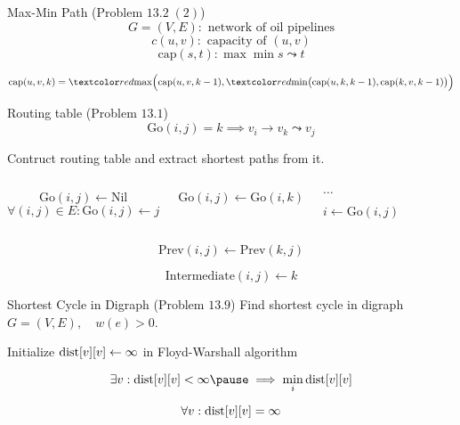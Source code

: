 \begin{frame}{}
  \begin{exampleblock}{Max-Min Path (Problem $13.2\; (2)$)}
    \[
      G = (V, E): \text{ network of oil pipelines}
    \]
    \[
      c(u,v): \text{ capacity of } (u,v)
    \]
    \[
      \text{cap}(s,t): \max \min s \leadsto t
    \]
      
    \vspace{0.30cm}
    \centerline{}
  \end{exampleblock}

  \pause
  \[
    \text{cap}(u,v,k) = \red{\max}\Big(\text{cap}(u,v,k-1), \red{\min}\big(\text{cap}(u,k,k-1), \text{cap}(k,v,k-1)\big)\Big)
  \]
\end{frame}
\begin{frame}{}
  \begin{exampleblock}{Routing table (Problem $13.1$)}
    \[
      \text{Go}(i,j) = k \implies v_i \to v_k \leadsto v_j
    \]

    Contruct routing table and extract shortest paths from it.
  \end{exampleblock}

  \pause
  \vspace{0.30cm}
  \begin{columns}
      \[
	\text{Go}(i,j) \gets \text{Nil}
      \]
      \[
	\forall (i,j) \in E: \text{Go}(i,j) \gets j
      \]

      \begin{algorithmic}
	\If{$\dots$}
	  \State $\text{Go}(i,j) \gets \text{Go}(i,k)$
	\EndIf
      \end{algorithmic}
      \begin{algorithmic}
	  \State $\dots$
	\EndIf

	\Statex
	  \State $i \gets \text{Go}(i,j)$
	\EndWhile
      \end{algorithmic}
  \end{columns}

  \pause
  \vspace{0.50cm}
  \[
    \text{Prev}(i,j) \gets \text{Prev}(k,j)
  \]

  \pause
  \[
    \text{Intermediate}(i,j) \gets k
  \]
\end{frame}
\begin{frame}{}
  \begin{exampleblock}{Shortest Cycle in Digraph (Problem $13.9$)}
    Find shortest cycle in digraph $G = (V, E), \quad w(e) > 0$.
  \end{exampleblock}

  \pause
  \vspace{0.50cm}
  \centerline{Initialize $\text{dist}[v][v] \gets \infty$ in Floyd-Warshall algorithm} 

  \pause
  \[
    \exists v: \dist[v][v] < \infty \pause \implies \min_{i} \dist[v][v]
  \]

  \pause
  \[
    \forall v: \text{dist}[v][v] = \infty
  \]
\end{frame}
